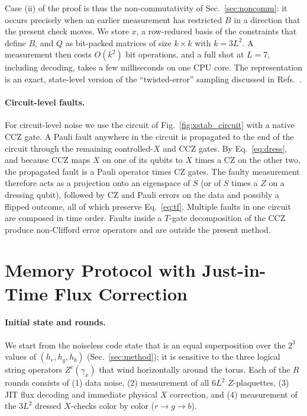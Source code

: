 \documentclass[a4paper]{article}
\newcommand{\rd}{r}
\newcommand{\gr}{g}
\newcommand{\bl}{b}
\begin{document}
Case (ii) of the proof is thus the non-commutativity of Sec.~\ref{sec:noncomm}: it occurs precisely when an earlier measurement has restricted $B$ in a direction that the present check moves. We store $x$, a row-reduced basis of the constraints that define $B$, and $Q$ as bit-packed matrices of size $k\times k$ with $k=3L^2$. A measurement then costs $O(k^2)$ bit operations, and a full shot at $L=7$, including decoding, takes a few milliseconds on one CPU core. The representation is an exact, state-level version of the ``twisted-error'' sampling discussed in Refs.~\cite{davydova2025knots,magdalena2026}.

\paragraph{Circuit-level faults.}
For circuit-level noise we use the circuit of Fig.~\ref{fig:xstab_circuit} with a native CCZ gate. A Pauli fault anywhere in the circuit is propagated to the end of the circuit through the remaining controlled-$X$ and CCZ gates. By Eq.~\eqref{eq:dress}, and because $\mathrm{CCZ}$ maps $X$ on one of its qubits to $X$ times a CZ on the other two, the propagated fault is a Pauli operator times CZ gates. The faulty measurement therefore acts as a projection onto an eigenspace of $S$ (or of $S$ times a $Z$ on a dressing qubit), followed by CZ and Pauli errors on the data and possibly a flipped outcome, all of which preserve Eq.~\eqref{eq:tf}. Multiple faults in one circuit are composed in time order. Faults inside a $T$-gate decomposition of the CCZ produce non-Clifford error operators and are outside the present method.

\section{Memory Protocol with Just-in-Time Flux Correction}
\label{sec:protocol}

\paragraph{Initial state and rounds.}
We start from the noiseless code state that is an equal superposition over the $2^3$ values of $(h_\rd,h_\gr,h_\bl)$ (Sec.~\ref{sec:method}); it is sensitive to the three logical string operators $Z^c(\gamma_x)$ that wind horizontally around the torus. Each of the $R$ rounds consists of (1) data noise, (2) measurement of all $6L^2$ $Z$-plaquettes, (3) JIT flux decoding and immediate physical $X$ correction, and (4) measurement of the $3L^2$ dressed $X$-checks color by color ($\rd\to\gr\to\bl$).
\end{document}
